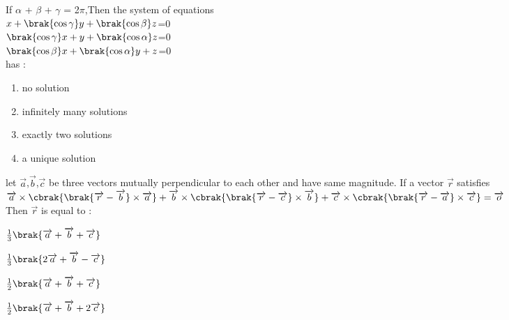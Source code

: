 \iffalse
\title{2021}
\author{EE24BTECH11050-Pothuri Rahul}
\section{mcq-single}
\fi

\item %
If $\alpha$ + $\beta$ + $\gamma$ = 2$\pi$,Then the system of equations \\
$x+\brak{\cos{\gamma}}y+\brak{\cos{\beta}}z$=0 \\
$\brak{\cos{\gamma}}x+y+\brak{\cos{\alpha}}z$=0 \\
$\brak{\cos{\beta}}x+\brak{\cos{\alpha}}y+z$=0 \\
has :
\begin{enumerate}
\item no solution
\item infinitely many solutions
\item exactly two solutions
\item a unique solution
\end{enumerate}
\item %
let $\overrightarrow{a}$,$\overrightarrow{b}$,$\overrightarrow{c}$ be three vectors mutually perpendicular to each other and have same magnitude. If a vector $\overrightarrow{r}$ satisfies \\
$\overrightarrow{a} \times \cbrak{\brak{\overrightarrow{r}-\overrightarrow{b}}\times\overrightarrow{a}}+\overrightarrow{b} \times \cbrak{\brak{\overrightarrow{r}-\overrightarrow{c}}\times\overrightarrow{b}}+\overrightarrow{c} \times \cbrak{\brak{\overrightarrow{r}-\overrightarrow{a}}\times\overrightarrow{c}} = \overrightarrow{o}$ \\
Then $\overrightarrow{r}$ is equal to : \\
\begin{enumerate}
\begin{multicols}{2}
\item
$\frac{1}{3} \brak{\overrightarrow{a}+\overrightarrow{b}+\overrightarrow{c}}$
\item
$\frac{1}{3} \brak{2\overrightarrow{a}+\overrightarrow{b}-\overrightarrow{c}}$
\end{multicols}
\begin{multicols}{2}
\item
$\frac{1}{2} \brak{\overrightarrow{a}+\overrightarrow{b}+\overrightarrow{c}}$
\item
$\frac{1}{2} \brak{\overrightarrow{a}+\overrightarrow{b}+2\overrightarrow{c}}$
\end{multicols}
\end{enumerate}
